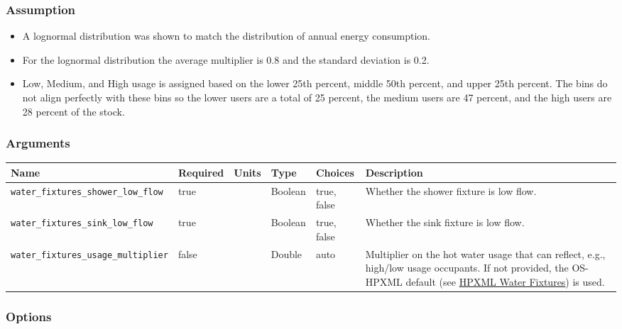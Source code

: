 \subsubsection{Assumption}\label{assumption-55}

\begin{itemize}
 
\item
  A lognormal distribution was shown to match the distribution of annual
  energy consumption.
\item
  For the lognormal distribution the average multiplier is 0.8 and the
  standard deviation is 0.2.
\item
  Low, Medium, and High usage is assigned based on the lower 25th
  percent, middle 50th percent, and upper 25th percent. The bins do not
  align perfectly with these bins so the lower users are a total of 25
  percent, the medium users are 47 percent, and the high users are 28
  percent of the stock.
\end{itemize}

\subsubsection{Arguments}\label{arguments-60}

\begin{longtable}[]{@{}llllll@{}}
\toprule\noalign{}
Name & Required & Units & Type & Choices & Description \\
\midrule\noalign{}
\endhead
\bottomrule\noalign{}
\endlastfoot
\texttt{water\_fixtures\_shower\_low\_flow} & true & & Boolean & true,
false & Whether the shower fixture is low flow. \\
\texttt{water\_fixtures\_sink\_low\_flow} & true & & Boolean & true,
false & Whether the sink fixture is low flow. \\
\texttt{water\_fixtures\_usage\_multiplier} & false & & Double & auto &
Multiplier on the hot water usage that can reflect, e.g., high/low usage
occupants. If not provided, the OS-HPXML default (see
\href{https://openstudio-hpxml.readthedocs.io/en/v1.7.0/workflow_inputs.html\#hpxml-water-fixtures}{HPXML
Water Fixtures}) is used. \\
\end{longtable}

\subsubsection{Options}\label{options-93}

